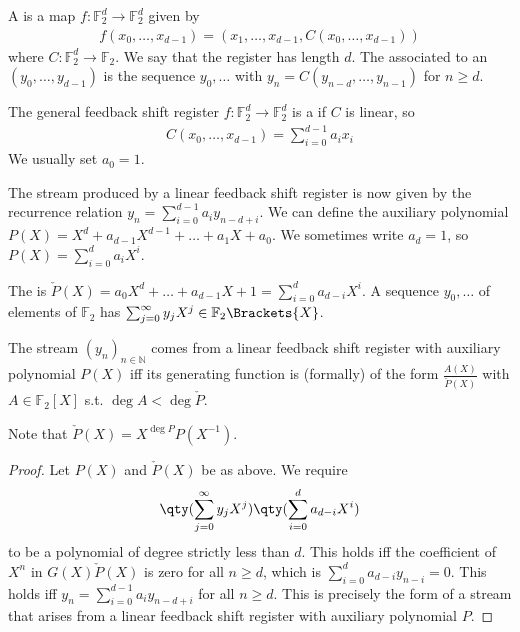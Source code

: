 \begin{definition}
    A  is a map $f \colon \mathbb F_2^d \to \mathbb F_2^d$ given by
    \begin{align*}
        f(x_0, \dots, x_{d-1}) = (x_1, \dots, x_{d-1}, C(x_0, \dots, x_{d-1}))
    \end{align*}
    where $C \colon \mathbb F_2^d \to \mathbb F_2$.
    We say that the register has length $d$.
    The  associated to an  $(y_0, \dots, y_{d-1})$ is the sequence $y_0, \dots$ with $y_n = C(y_{n-d}, \dots, y_{n-1})$ for $n \geq d$.
\end{definition}

\begin{definition}
    The general feedback shift register $f \colon \mathbb F_2^d \to \mathbb F_2^d$ is a  if $C$ is linear, so
    \begin{align*}
        C(x_0, \dots, x_{d-1}) = \sum_{i=0}^{d-1} a_i x_i
    \end{align*}
    We usually set $a_0 = 1$.
\end{definition}

The stream produced by a linear feedback shift register is now given by the recurrence relation $y_n = \sum_{i=0}^{d-1} a_i y_{n-d+i}$.
We can define the auxiliary polynomial $P(X) = X^d + a_{d-1} X^{d-1} + \dots + a_1 X + a_0$.
We sometimes write $a_d = 1$, so $P(X) = \sum_{i=0}^d a_i X^i$.

\begin{definition}
    The  is $\check{P}(X) = a_0 X^d + \dots + a_{d-1} X + 1 = \sum_{i=0}^d a_{d-i} X^i$.
    A sequence $y_0, \dots$ of elements of $\mathbb F_2$ has  $\sum_{j=0}^\infty y_j X^j \in \mathbb F_2\Brackets{X}$.
\end{definition}

\begin{theorem}
    The stream $(y_n)_{n \in \mathbb N}$ comes from a linear feedback shift register with auxiliary polynomial $P(X)$ iff its generating function is (formally) of the form $\frac{A(X)}{\check{P}(X)}$ with $A \in \mathbb F_2[X]$ s.t. $\deg A < \deg \check{P}$.
\end{theorem}

Note that $\check{P}(X) = X^{\deg P}P(X^{-1})$.

\begin{proof}
    Let $P(X)$ and $\check{P}(X)$ be as above.
    We require
    \begin{align*}
        \qty(\sum_{j=0}^\infty y_j X^j) \qty(\sum_{i=0}^d a_{d-i} X^i)
    \end{align*}
    to be a polynomial of degree strictly less than $d$.
    This holds iff the coefficient of $X^n$ in $G(X) \check{P}(X)$ is zero for all $n \geq d$, which is $\sum_{i=0}^d a_{d-i} y_{n-i} = 0$.
    This holds iff $y_n = \sum_{i=0}^{d-1} a_i y_{n-d + i}$ for all $n \geq d$.
    This is precisely the form of a stream that arises from a linear feedback shift register with auxiliary polynomial $P$.
\end{proof}

